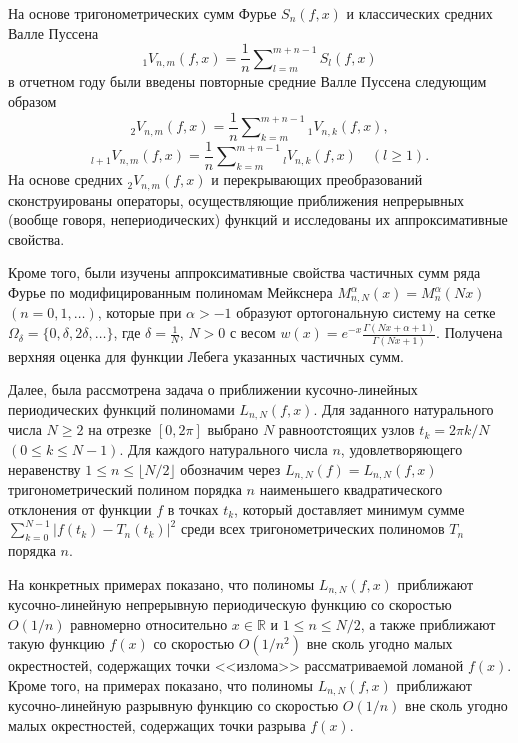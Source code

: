 На основе тригонометрических сумм Фурье $S_n(f,x)$ и классических средних Валле Пуссена
$$
_1V_{n,m}(f,x)= \frac1n\sum\nolimits_{l=m}^{m+n-1}S_l(f,x)
$$
 в отчетном году были введены повторные средние Валле Пуссена следующим образом
 $$
_2V_{n,m}(f,x)= \frac1n\sum\nolimits_{k=m}^{m+n-1}{}_1V_{n,k}(f,x),
$$
$$
{}_{l+1}V_{n,m}(f,x)= \frac1n\sum\nolimits_{k=m}^{m+n-1} {}_{l}V_{n,k}(f,x)\quad(l\ge1).
$$
На основе средних $_2V_{n,m}(f,x)$ и перекрывающих преобразований сконструированы операторы, осуществляющие   приближения непрерывных (вообще говоря, непериодических) функций и исследованы их аппроксимативные свойства.




Кроме того, были изучены аппроксимативные свойства частичных сумм ряда Фурье по модифицированным полиномам Мейкснера $M_{n,N}^\alpha(x)=M_n^\alpha(Nx)$ $(n=0, 1, \dots)$, которые при $\alpha>-1$ образуют ортогональную систему на сетке $\Omega_{\delta}=\{0, \delta, 2\delta, \ldots\}$, где $\delta=\frac{1}{N}$, $N>0$ с весом $w(x)=e^{-x}\frac{\Gamma(Nx+\alpha+1)}{\Gamma(Nx+1)}$.
Получена верхняя оценка для функции Лебега указанных частичных сумм.








Далее, была рассмотрена задача о приближении кусочно-линейных периодических функций полиномами $L_{n,N}(f,x)$.
Для заданного натурального числа $N \geq 2$ на отрезке $[0, 2\pi]$ выбрано $N$ равноотстоящих узлов $t_k = 2\pi k / N$ $(0 \leq k \leq N - 1)$. Для каждого натурального числа $n$, удовлетворяющего неравенству $1\leq n\leq\lfloor N/2\rfloor$ обозначим через $L_{n,N}(f)=L_{n,N}(f,x)$
тригонометрический полином порядка $n$ наименьшего квадратического отклонения от функции $f$ в точках $t_k$, который доставляет минимум сумме $\sum_{k=0}^{N-1}|f(t_k)-T_n(t_k)|^2$
среди всех тригонометрических полиномов $T_n$ порядка $n$.


На конкретных примерах показано, что полиномы $L_{n,N}(f,x)$ приближают кусочно-линейную непрерывную периодическую функцию со скоростью $O(1/n)$ равномерно относительно $x \in \mathbb{R}$ и $1 \leq n \leq N/2$, а также приближают такую функцию $f(x)$ со скоростью $O(1/n^2)$ вне сколь угодно малых окрестностей, содержащих точки <<излома>> рассматриваемой ломаной $f(x)$.
Кроме того, на примерах показано, что полиномы $L_{n,N}(f,x)$ приближают кусочно-линейную разрывную функцию со скоростью $O(1/n)$ вне сколь угодно малых окрестностей, содержащих точки разрыва $f(x)$.


